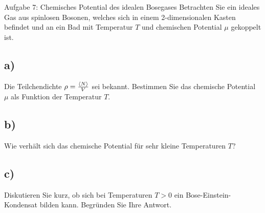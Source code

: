 \begin{aufgabe}{Aufgabe 7: Chemisches Potential des idealen Bosegases}
    Betrachten Sie ein ideales Gas aus spinlosen Bosonen, welches sich in einem 2-dimensionalen Kasten befindet und an ein Bad mit Temperatur $T$ und chemischen Potential $\mu$ gekoppelt ist.
    \subsection{a)}
    Die Teilchendichte $\rho = \frac{\left\langle N\right\rangle}{V}$ sei bekannt.
    Bestimmen Sie das chemische Potential $\mu$ als Funktion der Temperatur $T$.

    \subsection{b)}
    Wie verhält sich das chemische Potential für sehr kleine Temperaturen $T$?

    \subsection{c)}
    Diskutieren Sie kurz, ob sich bei Temperaturen $T > 0$ ein Bose-Einstein-Kondensat bilden kann.
    Begründen Sie Ihre Antwort.
\end{aufgabe}


